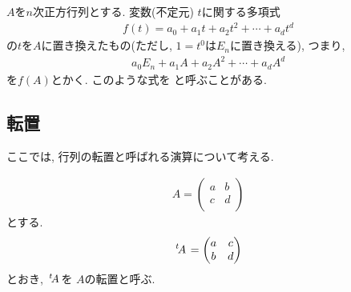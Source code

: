\begin{definition}
  \label{def:mat:polynomial}
 $A$を$n$次正方行列とする.
  変数(不定元) $t$に関する多項式
  \begin{align*}
    f(t)=a_0+a_1t+a_2t^2+\cdots +a_dt^d
  \end{align*}
  の$t$を$A$に置き換えたもの(ただし, $1=t^0$は$E_n$に置き換える),
  つまり,
  \begin{align*}
    a_0E_n+a_1A+a_2A^2+\cdots +a_dA^d
  \end{align*}
  を$f(A)$とかく. このような式を
  と呼ぶことがある.
\end{definition}

\subsection{転置}
ここでは, 行列の転置と呼ばれる演算について考える.

\begin{align*}
    A=
    \begin{pmatrix}
      a&b\\
      c&d\\
    \end{pmatrix}
  \end{align*}
  とする.
  \begin{align*}
    {\left.^{t}\!A\right.}=
    \begin{pmatrix}
      a&c\\
      b&d
    \end{pmatrix}
  \end{align*}
  とおき,
  ${\left.^{t}\!A\right.}$を
  $A$の転置と呼ぶ.

